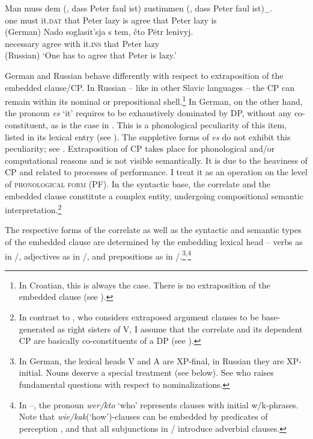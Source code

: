 \documentclass[output=paper,
colorlinks,
citecolor=brown,
newtxmath
]{langscibook}
\begin{document}
\ea\label{ex:2}
    \ea\label{ex:2a}\gll Man muss dem (, dass Peter faul ist)\textsubscript{\textalpha} zustimmen (, dass Peter faul ist)\textsubscript{$-$\textalpha}.\\
    one must it.\textsc{dat} {} that Peter lazy is agree {} that Peter lazy is\\ \hfill (German)
    \ex\label{ex:2b}\gll Nado soglasit'sja s tem, čto Pëtr lenivyj.\\
    necessary agree with it.\textsc{ins} that Peter lazy \\ \hfill (Russian)
    \z
    \glt `One has to agree that Peter is lazy.'
\z

    \largerpage[-1]

\noindent German and Russian behave differently with respect to extraposition of the embedded clause/CP. In Russian -- like in other Slavic languages -- the CP can remain within its nominal or prepositional shell.\footnote{In Croatian, this is always the case. There is no extraposition of the embedded clause (see \citealt{Willer-Gold2013}).} In German, on the other hand, the pronoun \textit{es} `it' requires to be exhaustively dominated by DP, without any co-constituent, as is the case in . This is a phonological peculiarity of this item, listed in its lexical entry (see ). The suppletive forms of \textit{es} do not exhibit this peculiarity; see . Extraposition of CP takes place for phonological and/or computational reasons and is not visible semantically. It is due to the heaviness of CP and related to processes of performance. I treat it as an operation on the level of \textsc{phonological form} (PF). In the syntactic base, the correlate and the embedded clause constitute a complex entity, undergoing compositional semantic interpretation.\footnote{In contrast to \citet[233ff.]{Haider2010}, who considers extraposed argument clauses to be base-generated as right sisters of V, I assume that the correlate and its dependent CP are basically co-constituents of a DP (see ).}

The respective forms of the correlate as well as the syntactic and semantic types of the embedded clause are determined by the embedding lexical head -- verbs as in /, adjectives as in /, and prepositions as in /.\footnote{In German, the lexical heads V and A are XP-final, in Russian they are XP-initial. Nouns deserve a special treatment (see below). See \citet{Knjazev2016} who raises fundamental questions with respect to nominalizations.}\textsuperscript{,}\footnote{In --, the pronoun \textit{wer/kto} `who' represents clauses with initial w/k-phrases. Note that \textit{wie/kak}(`how')-clauses can be embedded by predicates of perception \citep[see][]{Zimmermann1991}, and that all subjunctions in / introduce adverbial clauses.}
\end{document}
